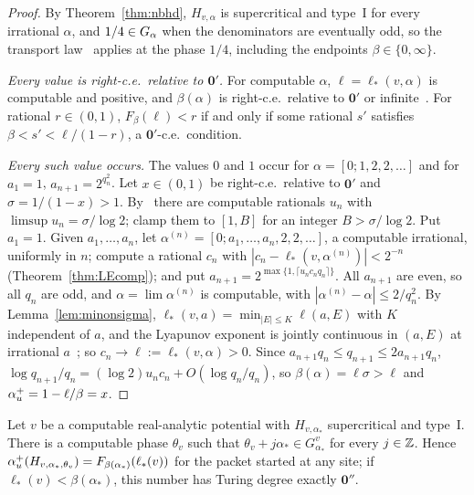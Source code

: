 \begin{proof}
By Theorem~\ref{thm:nbhd}, $H_{v,\alpha}$ is supercritical and type~I for every irrational $\alpha$, and $1/4\in G_\alpha$ when the denominators are eventually odd, so the transport law~\cite[Theorem~A]{DMuniv} applies at the phase $1/4$, including the endpoints $\beta\in\{0,\infty\}$.

\emph{Every value is right-c.e.\ relative to $\mathbf 0'$.} For computable $\alpha$, $\ell=\ell_*(v,\alpha)$ is computable and positive, and $\beta(\alpha)$ is right-c.e.\ relative to $\mathbf 0'$ or infinite~\cite[Lemma~11.1]{DMamo}. For rational $r\in(0,1)$, $F_\beta(\ell)<r$ if and only if some rational $s'$ satisfies $\beta<s'<\ell/(1-r)$, a $\mathbf 0'$-c.e.\ condition.

\emph{Every such value occurs.} The values $0$ and $1$ occur for $\alpha=[0;1,2,2,\dots]$ and for $a_1=1$, $a_{n+1}=2^{q_n^2}$. Let $x\in(0,1)$ be right-c.e.\ relative to $\mathbf 0'$ and $\sigma=1/(1-x)>1$. By~\cite[Lemma~11.1]{DMamo} there are computable rationals $u_n$ with $\limsup u_n=\sigma/\log2$; clamp them to $[1,B]$ for an integer $B>\sigma/\log2$. Put $a_1=1$. Given $a_1,\dots,a_n$, let $\alpha^{(n)}=[0;a_1,\dots,a_n,2,2,\dots]$, a computable irrational, uniformly in $n$; compute a rational $c_n$ with $|c_n-\ell_*(v,\alpha^{(n)})|<2^{-n}$ (Theorem~\ref{thm:LEcomp}); and put $a_{n+1}=2^{\max\{1,\lceil u_nc_nq_n\rceil\}}$. All $a_{n+1}$ are even, so all $q_n$ are odd, and $\alpha=\lim\alpha^{(n)}$ is computable, with $|\alpha^{(n)}-\alpha|\le2/q_n^2$. By Lemma~\ref{lem:minonsigma}, $\ell_*(v,a)=\min_{|E|\le K}\ell(a,E)$ with $K$ independent of $a$, and the Lyapunov exponent is jointly continuous in $(a,E)$ at irrational $a$~\cite[Theorem~1]{BourgainJitomirskaya2002}; so $c_n\to\ell:=\ell_*(v,\alpha)>0$. Since $a_{n+1}q_n\le q_{n+1}\le2a_{n+1}q_n$, $\log q_{n+1}/q_n=(\log2)u_nc_n+O(\log q_n/q_n)$, so $\beta(\alpha)=\ell\sigma>\ell$ and $\alpha_u^+=1-\ell/\beta=x$.
\end{proof}

\begin{proposition}\label{prop:goodphase}
Let $v$ be a computable real-analytic potential with $H_{v,\alpha_*}$ supercritical and type~I. There is a computable phase $\theta_v$ such that $\theta_v+j\alpha_*\in G^v_{\alpha_*}$ for every $j\in\mathbb Z$. Hence $\alpha_u^+(H_{v,\alpha_*,\theta_v})=F_{\beta(\alpha_*)}(\ell_*(v))$ for the packet started at any site; if $\ell_*(v)<\beta(\alpha_*)$, this number has Turing degree exactly $\mathbf 0''$.
\end{proposition}

